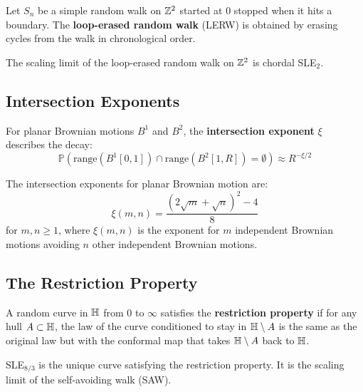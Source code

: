 \begin{definition}
Let $S_n$ be a simple random walk on $\mathbb{Z}^2$ started at $0$ stopped when it hits a boundary. The \textbf{loop-erased random walk} (LERW) is obtained by erasing cycles from the walk in chronological order.
\end{definition}

\begin{theorem}
The scaling limit of the loop-erased random walk on $\mathbb{Z}^2$ is chordal SLE$_2$.
\end{theorem}

\subsection{Intersection Exponents}

\begin{definition}
For planar Brownian motions $B^1$ and $B^2$, the \textbf{intersection exponent} $\xi$ describes the decay:
\[
\mathbb{P}(\text{range}(B^1[0,1]) \cap \text{range}(B^2[1,R]) = \emptyset) \approx R^{-\xi/2}
\]
\end{definition}

\begin{theorem}
The intersection exponents for planar Brownian motion are:
\[
\xi(m,n) = \frac{(2\sqrt{m} + \sqrt{n})^2 - 4}{8}
\]
for $m,n \geq 1$, where $\xi(m,n)$ is the exponent for $m$ independent Brownian motions avoiding $n$ other independent Brownian motions.
\end{theorem}

\subsection{The Restriction Property}

\begin{definition}
A random curve in $\H$ from $0$ to $\infty$ satisfies the \textbf{restriction property} if for any hull $A \subset \H$, the law of the curve conditioned to stay in $\H \setminus A$ is the same as the original law but with the conformal map that takes $\H \setminus A$ back to $\H$.
\end{definition}

\begin{theorem}
SLE$_{8/3}$ is the unique curve satisfying the restriction property. It is the scaling limit of the self-avoiding walk (SAW).
\end{theorem}

